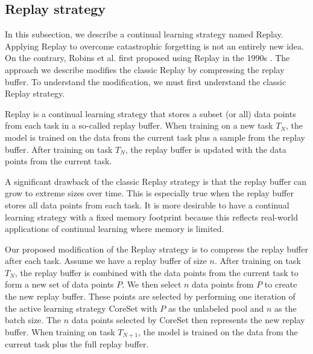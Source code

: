 \subsection{Replay strategy}
\label{sec:Methodology:ReplayStrategy}
In this subsection, we describe a continual learning strategy named Replay. Applying Replay to overcome catastrophic forgetting is not an entirely new idea.
On the contrary, Robins et al. first proposed using Replay in the 1990s \cite{robins1995catastrophic}. The approach we describe modifies the classic Replay
by compressing the replay buffer. To understand the modification, we must first understand the classic Replay strategy. \par
Replay is a continual learning strategy that stores a subset (or all) data points from each task in a so-called replay buffer. When training on a new task
$T_N$, the model is trained on the data from the current task plus a sample from the replay buffer. After training on task $T_N$, the replay buffer is updated
with the data points from the current task. \par
A significant drawback of the classic Replay strategy is that the replay buffer can grow to extreme sizes over time. This is especially true when the replay
buffer stores all data points from each task. It is more desirable to have a continual learning strategy with a fixed memory footprint because this reflects
real-world applications of continual learning where memory is limited. \par
Our proposed modification of the Replay strategy is to compress the replay buffer after each task. Assume we have a replay buffer of size $n$. After
training on task $T_N$, the replay buffer is combined with the data points from the current task to form a new set of data points $P$. We then select $n$
data points from $P$ to create the new replay buffer. These points are selected by performing one iteration of the active learning strategy CoreSet
\cite{sener2017active} with $P$ as the unlabeled pool and $n$ as the batch size. The $n$ data points selected by CoreSet then represents the new replay buffer.
When training on task $T_{N+1}$, the model is trained on the data from the current task plus the full replay buffer.

